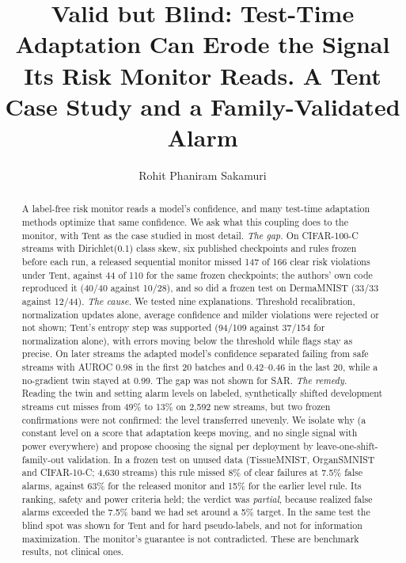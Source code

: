 \documentclass[runningheads]{llncs}
\begin{document}
\title{Valid but Blind: Test-Time Adaptation Can Erode the Signal Its Risk Monitor Reads. A Tent Case Study and a Family-Validated Alarm}
\author{Rohit Phaniram Sakamuri}

\maketitle

\begin{abstract}
A label-free risk monitor reads a model's confidence, and many test-time adaptation methods optimize that same confidence. We ask what this coupling does to the monitor, with Tent as the case studied in most detail. \emph{The gap.} On CIFAR-100-C streams with Dirichlet(0.1) class skew, six published checkpoints and rules frozen before each run, a released sequential monitor missed 147 of 166 clear risk violations under Tent, against 44 of 110 for the same frozen checkpoints; the authors' own code reproduced it (40/40 against 10/28), and so did a frozen test on DermaMNIST (33/33 against 12/44). \emph{The cause.} We tested nine explanations. Threshold recalibration, normalization updates alone, average confidence and milder violations were rejected or not shown; Tent's entropy step was supported (94/109 against 37/154 for normalization alone), with errors moving below the threshold while flags stay as precise. On later streams the adapted model's confidence separated failing from safe streams with AUROC 0.98 in the first 20 batches and 0.42--0.46 in the last 20, while a no-gradient twin stayed at 0.99. The gap was not shown for SAR. \emph{The remedy.} Reading the twin and setting alarm levels on labeled, synthetically shifted development streams cut misses from 49\% to 13\% on 2,592 new streams, but two frozen confirmations were not confirmed: the level transferred unevenly. We isolate why (a constant level on a score that adaptation keeps moving, and no single signal with power everywhere) and propose choosing the signal per deployment by leave-one-shift-family-out validation. In a frozen test on unused data (TissueMNIST, OrganSMNIST and CIFAR-10-C; 4,630 streams) this rule missed 8\% of clear failures at 7.5\% false alarms, against 63\% for the released monitor and 15\% for the earlier level rule. Its ranking, safety and power criteria held; the verdict was \emph{partial}, because realized false alarms exceeded the 7.5\% band we had set around a 5\% target. In the same test the blind spot was shown for Tent and for hard pseudo-labels, and not for information maximization. The monitor's guarantee is not contradicted. These are benchmark results, not clinical ones.
\end{abstract}
\end{document}
